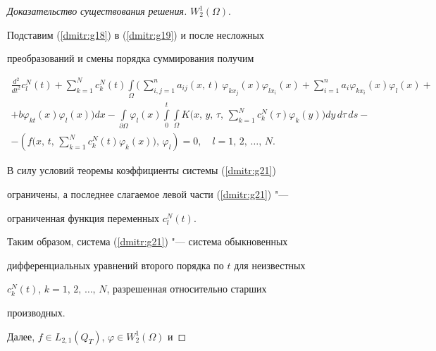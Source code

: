 \begin{proof}[Доказательство\,\,существования\,\,решения]
$W_2^1(\Omega)$.








Подставим (\ref{dmitr:g18}) в (\ref{dmitr:g19}) и после несложных


преобразований и смены порядка суммирования получим


\begin{multline}


 \frac {d^2}{dt^2}c_l^N(t)


+\sum\limits_{k=1}^Nc_k^N(t) \int\limits_{\Omega}


\biggl(\,\sum\limits_{i,j=1}^n


a_{ij}(x,\, t)\,\varphi_{kx_j}(x)\varphi_{lx_i}(x)+\sum\limits_{i=1}^{n}a_i \varphi_{kx_i}(x) \varphi_{l}(x)+


\\


+b \varphi_{kt}(x)\varphi_{l}(x)\biggr) dx


-\int\limits_{\partial\Omega}\varphi_l(x) \int\limits_0^t


\int\limits_{\Omega}K\biggl(x,\, y,\, \tau,\, \sum\limits_{k=1}^Nc_k^N(\tau) \varphi_{k}(y)\biggr)dy\,d\tau\,ds-


\\


\label{dmitr:g21}


-\left(f\biggl(x,\, t,\, \sum\limits_{k=1}^Nc_k^N(t)\varphi_k(x)\biggr),\, \varphi_l\right)=0,\quad l=1,\, 2,\,\ldots,\,N.


\end{multline}





В силу условий теоремы коэффициенты системы (\ref{dmitr:g21})


ограничены, а последнее слагаемое левой части (\ref{dmitr:g21}) "---


ограниченная функция переменных $c_l^N(t)$.





Таким образом, система (\ref{dmitr:g21}) "--- система обыкновенных


дифференциальных уравнений второго порядка по $t$ для неизвестных


$c^N_k(t)$, $k=1,\, 2,\,\ldots,\,N$, разрешенная относительно старших


производных.


Далее, $f \in L_{2,1}(Q_T)$, \linebreak \mbox{$\varphi \in W_2^1(\Omega)$} и



\end{proof}

